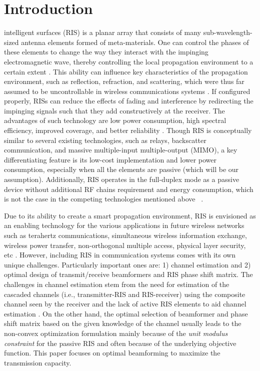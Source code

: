 \documentclass[journal,draftclsnofoot,onecolumn,12pt]{IEEEtran}
\begin{document}
\section{Introduction}
 intelligent surfaces (RIS) is a planar array that consists of many sub-wavelength-sized antenna elements formed of meta-materials. One can control the phases of these elements to change the way they interact with the impinging electromagnetic wave, thereby controlling the local propagation environment to a certain extent \cite{Emil_SigProcessing_2022}. This ability can influence key characteristics of the propagation environment, such as reflection, refraction, and scattering, which were thus far assumed to be uncontrollable in wireless communications systems \cite{CuiTieJun_CodingMetamaterial_2014,LiuYuanwei_RISprinciples_2021}. If configured properly, RISs can reduce the effects of fading and interference by redirecting the impinging signals such that they add constructively at the receiver. The advantages of such technology are low power consumption, high spectral efficiency, improved coverage, and better reliability \cite{PanCunhua_2021_6G,HuangChongwen_2019_EE}. Though RIS is conceptually similar to several existing technologies, such as relays, backscatter communication, and massive multiple-input multiple-output (MIMO), a key differentiating feature is its low-cost implementation and lower power consumption, especially when all the elements are passive (which will be our assumption). Additionally, RIS operates in the full-duplex mode as a passive device  without additional RF chains requirement and energy consumption, which is not the case in the competing technologies mentioned above ~\cite{WuQingging_RIS_comparisons,DiRenzo_RISvsRelay_2020}.

Due to its ability to create a smart propagation environment, RIS is envisioned as an enabling technology for the various applications in future wireless networks such as terahertz communications, simultaneous wireless information exchange, wireless power transfer, non-orthogonal multiple access, physical layer security, etc \cite{pradhan2022robust,PanCunhua_2021_6G,HuangJie_ChannelModeling_2022}. However, including RIS in communication systems comes with its own unique challenges. Particularly important ones are: 1) channel estimation and 2) optimal design of transmit/receive beamformers and RIS phase shift matrix.
The challenges in channel estimation stem from the need for estimation of the cascaded channels (i.e., transmitter-RIS and RIS-receiver) using the composite channel seen by the receiver \cite{ZhengBeixiong_ChEst_Survey} and the lack of active RIS elements to aid  channel estimation  \cite{MiguelDajer_2022}. 
On the other hand, the optimal selection of beamformer and phase shift matrix based on the given knowledge of the channel usually leads to the non-convex optimization formulation mainly because of the {\em unit modulus constraint} for the passive RIS \cite{BasarErtugrul_20219} and often because of the underlying objective function. This paper focuses on optimal beamforming to maximize the transmission capacity.
\end{document}
